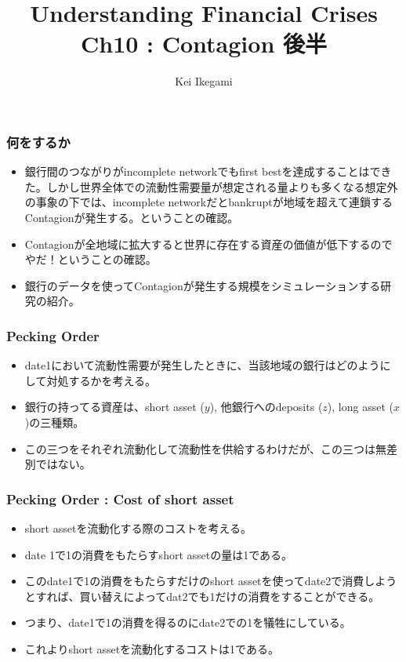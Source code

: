 \documentclass[dvipdfmx, 12pt]{beamer}
\title{Understanding Financial Crises\\Ch10 : Contagion 後半}
\author{Kei Ikegami}
\begin{document}
\newcommand{\argmin}{\mathop{\rm arg~min}\limits}

\frame{\maketitle}

\begin{frame}\frametitle{何をするか}
	\begin{itemize}
	\item 銀行間のつながりがincomplete networkでもfirst bestを達成することはできた。しかし世界全体での流動性需要量が想定される量よりも多くなる想定外の事象の下では、incomplete networkだとbankruptが地域を超えて連鎖するContagionが発生する。ということの確認。
	\item Contagionが全地域に拡大すると世界に存在する資産の価値が低下するのでやだ！ということの確認。
	\item 銀行のデータを使ってContagionが発生する規模をシミュレーションする研究の紹介。
	\end{itemize}
\end{frame}

\begin{frame}\frametitle{Pecking Order}
	\begin{itemize}
	\item date1において流動性需要が発生したときに、当該地域の銀行はどのようにして対処するかを考える。
	\item 銀行の持ってる資産は、short asset ($y$), 他銀行へのdeposits ($z$), long asset ($x$)の三種類。
	\item この三つをそれぞれ流動化して流動性を供給するわけだが、この三つは無差別ではない。
	\end{itemize}
\end{frame}

\begin{frame}\frametitle{Pecking Order : Cost of short asset}
	\begin{itemize}
	\item short assetを流動化する際のコストを考える。
	\item date 1で1の消費をもたらすshort assetの量は1である。
	\item このdate1で1の消費をもたらすだけのshort assetを使ってdate2で消費しようとすれば、買い替えによってdat2でも1だけの消費をすることができる。
	\item つまり、date1で1の消費を得るのにdate2での1を犠牲にしている。
	\item これよりshort assetを流動化するコストは1である。
	\end{itemize}
\end{frame}
\end{document}
